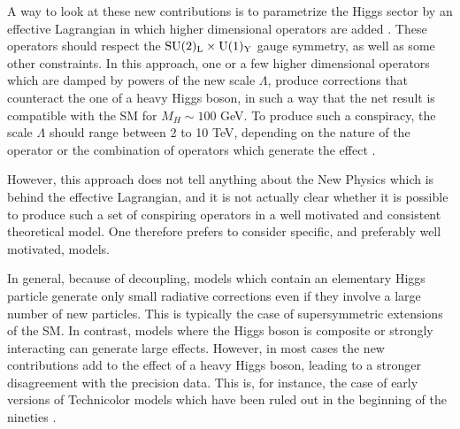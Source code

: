 A way to look at these new contributions is to parametrize the Higgs sector by
an effective Lagrangian in which higher dimensional operators are added
\cite{HVV-Effective,Hff-Effective}.  These operators should respect the ${\rm 
SU(2)_L \times U(1)_Y}$ gauge symmetry, as well as some other constraints.  In 
this approach, one or a few higher dimensional operators which are damped by 
powers of the new scale $\Lambda$, produce corrections that counteract the one 
of a heavy Higgs boson, in such a way that the net result is compatible with 
the SM for $M_H \sim
100$ GeV. To produce such a conspiracy, the scale $\Lambda$ should range
between 2 to 10 TeV, depending on the nature of the operator or the combination
of operators which generate the effect \cite{High-operators}.\s 

However, this approach does not tell anything about the New Physics which is
behind the effective Lagrangian, and it is not actually clear whether it is 
possible to produce such a set of conspiring operators in a well motivated and 
consistent theoretical model. One therefore prefers to consider specific, and 
preferably well motivated, models. \s  

In general, because of decoupling, models which contain an elementary Higgs 
particle generate only small radiative corrections even if they involve a large
number of new particles. This is typically the case of supersymmetric 
extensions of the SM. In contrast, models where the Higgs boson is composite
or strongly interacting can generate large effects. However, in most cases
the new contributions add to the effect of a heavy Higgs boson, leading to a 
stronger disagreement with the precision data. This is, for instance, the case 
of early versions of Technicolor models which have been ruled out 
in the beginning of the nineties \cite{STU-approach}. \s

